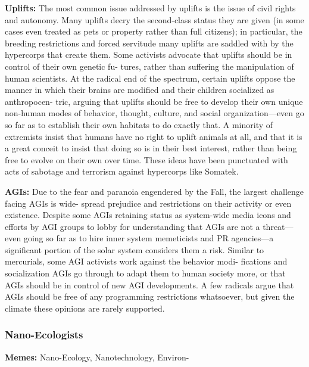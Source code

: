 \textbf{Uplifts: }The most common issue addressed by uplifts 
is the issue of civil rights and autonomy. Many uplifts 
decry the second-class status they are given (in some 
cases even treated as pets or property rather than full 
citizens); in particular, the breeding restrictions and 
forced servitude many uplifts are saddled with by the 
hypercorps that create them. Some activists advocate 
that uplifts should be in control of their own genetic fu-
tures, rather than suffering the manipulation of human 
scientists. At the radical end of the spectrum, certain 
uplifts oppose the manner in which their brains are 
modified and their children socialized as anthropocen-
tric, arguing that uplifts should be free to develop their 
own unique non-human modes of behavior, thought, 
culture, and social organization—even go so far as 
to establish their own habitats to do exactly that. A 
minority of extremists insist that humans have no right 
to uplift animals at all, and that it is a great conceit 
to insist that doing so is in their best interest, rather 
than being free to evolve on their own over time. These 
ideas have been punctuated with acts of sabotage and 
terrorism against hypercorps like Somatek.

\textbf{AGIs:} Due to the fear and paranoia engendered 
by the Fall, the largest challenge facing AGIs is wide-
spread prejudice and restrictions on their activity or 
even existence. Despite some AGIs retaining status as 
system-wide media icons and efforts by AGI groups to 
lobby for understanding that AGIs are not a threat—
even going so far as to hire inner system memeticists 
and PR agencies—a significant portion of the solar 
system considers them a risk. Similar to mercurials, 
some AGI activists work against the behavior modi-
fications and socialization AGIs go through to adapt 
them to human society more, or that AGIs should be 
in control of new AGI developments. A few radicals 
argue that AGIs should be free of any programming 
restrictions whatsoever, but given the climate these 
opinions are rarely supported.

\subsubsection{Nano-Ecologists}

\textbf{Memes:} Nano-Ecology, Nanotechnology, Environ-

